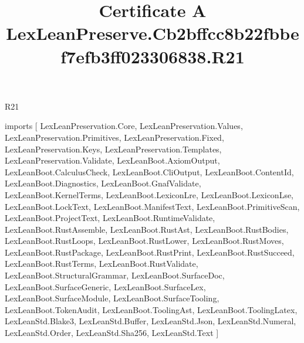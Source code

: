 \begin{lexlean}{R21}
\title{Certificate A LexLeanPreserve.Cb2bffcc8b22fbbef7efb3ff023306838.R21}
\begin{coremodule}
imports [
  LexLeanPreservation.Core,
  LexLeanPreservation.Values,
  LexLeanPreservation.Primitives,
  LexLeanPreservation.Fixed,
  LexLeanPreservation.Keys,
  LexLeanPreservation.Templates,
  LexLeanPreservation.Validate,
  LexLeanBoot.AxiomOutput,
  LexLeanBoot.CalculusCheck,
  LexLeanBoot.CliOutput,
  LexLeanBoot.ContentId,
  LexLeanBoot.Diagnostics,
  LexLeanBoot.GnafValidate,
  LexLeanBoot.KernelTerms,
  LexLeanBoot.LexiconLre,
  LexLeanBoot.LexiconLse,
  LexLeanBoot.LockText,
  LexLeanBoot.ManifestText,
  LexLeanBoot.PrimitiveScan,
  LexLeanBoot.ProjectText,
  LexLeanBoot.RuntimeValidate,
  LexLeanBoot.RustAssemble,
  LexLeanBoot.RustAst,
  LexLeanBoot.RustBodies,
  LexLeanBoot.RustLoops,
  LexLeanBoot.RustLower,
  LexLeanBoot.RustMoves,
  LexLeanBoot.RustPackage,
  LexLeanBoot.RustPrint,
  LexLeanBoot.RustSucceed,
  LexLeanBoot.RustTerms,
  LexLeanBoot.RustValidate,
  LexLeanBoot.StructuralGrammar,
  LexLeanBoot.SurfaceDoc,
  LexLeanBoot.SurfaceGeneric,
  LexLeanBoot.SurfaceLex,
  LexLeanBoot.SurfaceModule,
  LexLeanBoot.SurfaceTooling,
  LexLeanBoot.TokenAudit,
  LexLeanBoot.ToolingAst,
  LexLeanBoot.ToolingLatex,
  LexLeanStd.Blake3,
  LexLeanStd.Buffer,
  LexLeanStd.Json,
  LexLeanStd.Numeral,
  LexLeanStd.Order,
  LexLeanStd.Sha256,
  LexLeanStd.Text
]


\end{coremodule}
\end{lexlean}
